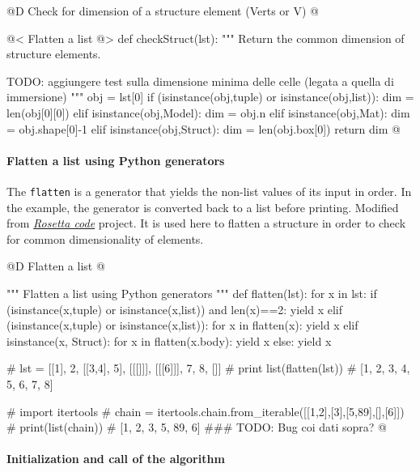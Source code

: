 \documentclass[11pt,oneside]{article}    %
\begin{document}
@D Check for dimension of a structure element (Verts or V)
@{@< Flatten a list @>
def checkStruct(lst):
    """ Return the common dimension of structure elements.

        TODO: aggiungere test sulla dimensione minima delle celle (legata a quella di immersione)
    """
    obj = lst[0]
    if (isinstance(obj,tuple) or isinstance(obj,list)):
        dim = len(obj[0][0])
    elif isinstance(obj,Model): 
        dim = obj.n    
    elif isinstance(obj,Mat): 
        dim = obj.shape[0]-1    
    elif isinstance(obj,Struct): 
        dim = len(obj.box[0])    
    return dim
@}

\paragraph{Flatten a list using Python generators}
The \texttt{flatten} is a generator that yields the non-list values of its input in order. In the example, the generator is converted back to a list before printing. Modified from \href{http://rosettacode.org/wiki/Flatten_a_list#Python}{\emph{Rosetta code}} project. It is used here to flatten a structure in order to check for common dimensionality of elements.

@D Flatten a list
@{""" Flatten a list using Python generators """
def flatten(lst):
    for x in lst:
        if (isinstance(x,tuple) or isinstance(x,list)) and len(x)==2:
            yield x
        elif (isinstance(x,tuple) or isinstance(x,list)):
            for x in flatten(x):
                yield x
        elif isinstance(x, Struct):
            for x in flatten(x.body):
                yield x
        else:
            yield x
 
#  lst = [[1], 2, [[3,4], 5], [[[]]], [[[6]]], 7, 8, []]
#  print list(flatten(lst)) 
#  [1, 2, 3, 4, 5, 6, 7, 8]

#  import itertools
#  chain = itertools.chain.from_iterable([[1,2],[3],[5,89],[],[6]])
#  print(list(chain))
#  [1, 2, 3, 5, 89, 6]    ###  TODO: Bug coi dati sopra?
@}

\paragraph{Initialization and call of the algorithm}
\end{document}
